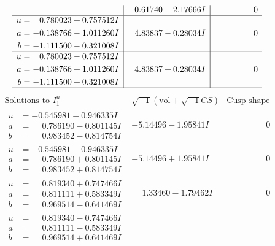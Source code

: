 \documentclass[1p]{elsarticle_modified}
\theoremstyle{definition}
\newcommand{\I}{\sqrt{-1}}
\begin{document}
$$\begin{array}{c|c|c}
 & \phantom{-}0.61740 - 2.17666 I & \phantom{-0.000000 } 0 \\ \hline\begin{aligned}
u &= \phantom{-}0.780023 + 0.757512 I \\
a &= -0.138766 - 1.011260 I \\
b &= -1.111500 - 0.321008 I\end{aligned}
 & \phantom{-}4.83837 - 0.28034 I & \phantom{-0.000000 } 0 \\ \hline\begin{aligned}
u &= \phantom{-}0.780023 - 0.757512 I \\
a &= -0.138766 + 1.011260 I \\
b &= -1.111500 + 0.321008 I\end{aligned}
 & \phantom{-}4.83837 + 0.28034 I & \phantom{-0.000000 } 0\\
 \hline 
 \end{array}$$\newpage$$\begin{array}{c|c|c}  
\text{Solutions to }I^u_{1}& \I (\text{vol} + \sqrt{-1}CS) & \text{Cusp shape}\\
 \hline 
\begin{aligned}
u &= -0.545981 + 0.946335 I \\
a &= \phantom{-}0.786190 - 0.801145 I \\
b &= \phantom{-}0.983452 - 0.814754 I\end{aligned}
 & -5.14496 - 1.95841 I & \phantom{-0.000000 } 0 \\ \hline\begin{aligned}
u &= -0.545981 - 0.946335 I \\
a &= \phantom{-}0.786190 + 0.801145 I \\
b &= \phantom{-}0.983452 + 0.814754 I\end{aligned}
 & -5.14496 + 1.95841 I & \phantom{-0.000000 } 0 \\ \hline\begin{aligned}
u &= \phantom{-}0.819340 + 0.747466 I \\
a &= \phantom{-}0.811111 + 0.583349 I \\
b &= \phantom{-}0.969514 - 0.641469 I\end{aligned}
 & \phantom{-}1.33460 - 1.79462 I & \phantom{-0.000000 } 0 \\ \hline\begin{aligned}
u &= \phantom{-}0.819340 - 0.747466 I \\
a &= \phantom{-}0.811111 - 0.583349 I \\
b &= \phantom{-}0.969514 + 0.641469 I\end{aligned}

\end{array}$$
\end{document}
